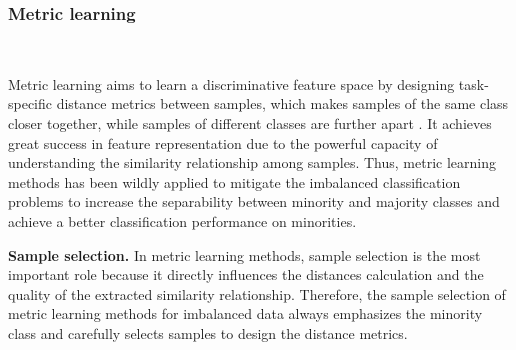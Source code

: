 \subsubsection{Metric learning}\
\label{s322}

Metric learning aims to learn a discriminative feature space by designing task-specific distance metrics between samples, which makes samples of the same class closer together, while samples of different classes are further apart \cite{duan2017deep}. It achieves great success in feature representation due to the powerful capacity of understanding the similarity relationship among samples. Thus, metric learning methods has been wildly applied to mitigate the imbalanced classification problems to increase the separability between minority and majority classes and achieve a better classification performance on minorities. 

\textbf{Sample selection.}
In metric learning methods, sample selection is the most important role because it directly influences the distances calculation and the quality of the extracted similarity relationship. Therefore, the sample selection of metric learning methods for imbalanced data always emphasizes the minority class \cite{huang2016learning, dong2017class, wang2018iterative, gui2022quadruplet, yan2023borderline} and carefully selects samples to design the distance metrics.  

